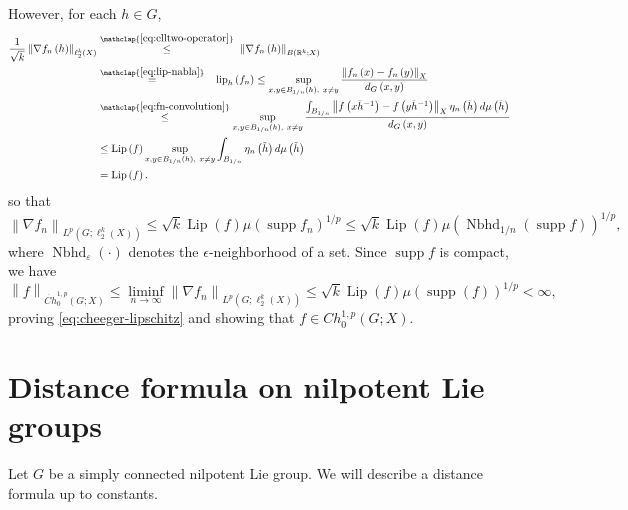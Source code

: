 \documentclass[11pt,reqno]{amsart}
\newcommand{\1}{\mathbf 1}
\begin{document}
However, for each $h\in G$,
\begin{align}\label{eq:approx-lip}
\begin{aligned}
\frac{1}{\sqrt{k}}\left\|\nabla f_n\left(h\right)\right\|_{\ell_2^k(X)}&\stackrel{\mathclap{\eqref{eq:elltwo-operator}}}{\le}~ \left\|\nabla f_n\left(h\right)\right\|_{B\left(\mathbb{R}^k;X\right)}\\
&\stackrel{\mathclap{\eqref{eq:lip-nabla}}}{=}~\, ~\operatorname{lip}_h\left(f_n\right)\le \sup_{x,y\in B_{1/n}\left(h\right),~x\neq y}\frac{\left\|f_n\left(x\right)-f_n\left(y\right)\right\|_X}{d_G\left(x,y\right)}\\
&\stackrel{\mathclap{\eqref{eq:fn-convolution}}}{\le} \sup_{x,y\in B_{1/n}\left(h\right),~x\neq y}\frac{\int_{B_{1/n}}\left\|f\left(x\tilde{h}^{-1}\right)-f\left(y\tilde{h}^{-1}\right)\right\|_X\eta_n\left(\tilde{h}\right)d\mu\left(\tilde{h}\right)}{d_G\left(x,y\right)}\\
&\le \operatorname{Lip}\left(f\right)\sup_{x,y\in B_{1/n}\left(h\right),~x\neq y}\int_{B_{1/n}}\eta_n\left(\tilde{h}\right)d\mu\left(\tilde{h}\right)\\
&=\operatorname{Lip}\left(f\right).
\end{aligned}
\end{align}
so that
\[
\left\|\nabla f_n\right\|_{L^p\left(G;\ell_2^k\left(X\right)\right)}\le \sqrt{k}\operatorname{Lip}\left(f\right)\mu\left(\operatorname{supp}f_n\right)^{1/p}\le \sqrt{k}\operatorname{Lip}\left(f\right)\mu\left(\operatorname{Nbhd}_{1/n}\left(\operatorname{supp}f\right)\right)^{1/p},
\]
where $\operatorname{Nbhd}_\varepsilon\left(\cdot\right)$ denotes the $\epsilon$-neighborhood of a set. Since $\operatorname{supp}f$ is compact, we have
\[
\left\|f\right\|_{\dot{Ch}^{1,p}_0\left(G;X\right)}\le\liminf_{n\to\infty} \left\|\nabla f_n\right\|_{L^p\left(G;\ell_2^k\left(X\right)\right)}\le \sqrt{k}
 \operatorname{Lip}\left(f\right)\mu\left(\operatorname{supp}\left(f\right)\right)^{1/p}<\infty,
\]
proving \eqref{eq:cheeger-lipschitz} and showing that $f\in Ch_0^{1,p}\left(G;X\right)$.
\section{Distance formula on nilpotent Lie groups}
\label{app:doubling}
Let $G$ be a simply connected nilpotent Lie group. We will describe a distance formula up to constants.
\end{document}
